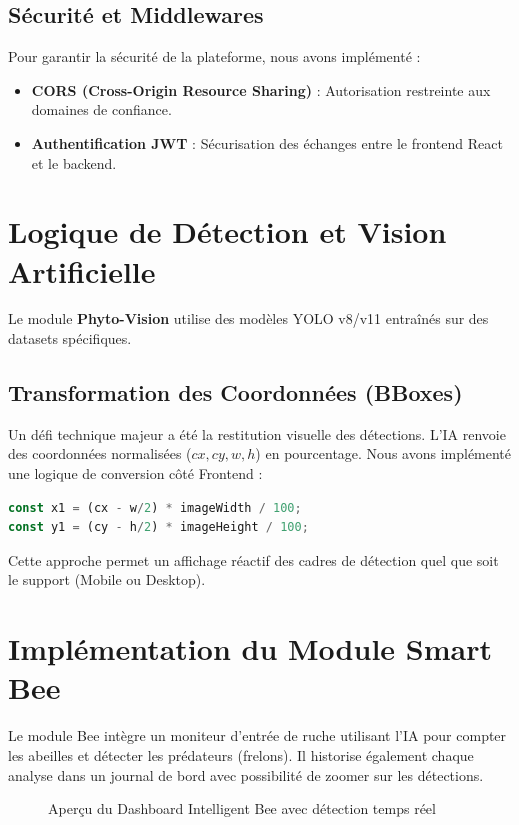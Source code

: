 \documentclass[12pt,a4paper,oneside]{report}
\begin{document}
\subsection{Sécurité et Middlewares}
Pour garantir la sécurité de la plateforme, nous avons implémenté :
\begin{itemize}
    \item \textbf{CORS (Cross-Origin Resource Sharing)} : Autorisation restreinte aux domaines de confiance.
    \item \textbf{Authentification JWT} : Sécurisation des échanges entre le frontend React et le backend.
\end{itemize}

\section{Logique de Détection et Vision Artificielle}
Le module \textbf{Phyto-Vision} utilise des modèles YOLO v8/v11 entraînés sur des datasets spécifiques.

\subsection{Transformation des Coordonnées (BBoxes)}
Un défi technique majeur a été la restitution visuelle des détections. L'IA renvoie des coordonnées normalisées ($cx, cy, w, h$) en pourcentage. Nous avons implémenté une logique de conversion côté Frontend :
\begin{lstlisting}[language=JavaScript]
const x1 = (cx - w/2) * imageWidth / 100;
const y1 = (cy - h/2) * imageHeight / 100;
\end{lstlisting}
Cette approche permet un affichage réactif des cadres de détection quel que soit le support (Mobile ou Desktop).

\section{Implémentation du Module Smart Bee}
Le module Bee intègre un moniteur d'entrée de ruche utilisant l'IA pour compter les abeilles et détecter les prédateurs (frelons). Il historise également chaque analyse dans un journal de bord avec possibilité de zoomer sur les détections.

\begin{figure}[H]
    \centering
    \caption{Aperçu du Dashboard Intelligent Bee avec détection temps réel}
\end{figure}
\end{document}
